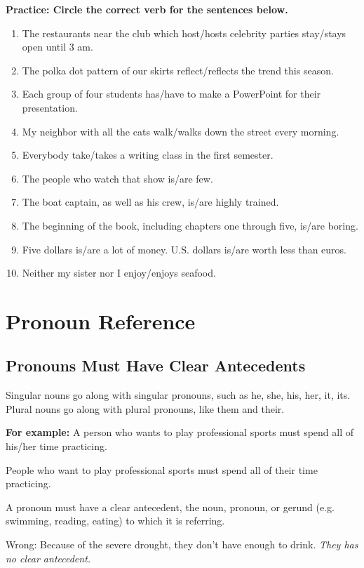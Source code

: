 \documentclass[12pt]{book}
\begin{document}
\bigskip
\textbf{Practice: Circle the correct verb for the sentences below.}
\begin{enumerate} 
\item{The restaurants near the club which host/hosts celebrity parties stay/stays open until 3 am.}
\item{The polka dot pattern of our skirts reflect/reflects the trend this season.}
\item{Each group of four students has/have to make a PowerPoint for their presentation.}
\item{My neighbor with all the cats walk/walks down the street every morning.}
\item{Everybody take/takes a writing class in the first semester.}
\item{The people who watch that show is/are few.}
\item{The boat captain, as well as his crew, is/are highly trained.}
\item{The beginning of the book, including chapters one through five, is/are boring.}
\item{Five dollars is/are a lot of money.  U.S. dollars is/are worth less than euros.}
\item{Neither my sister nor I enjoy/enjoys seafood.}
\end{enumerate}

\bigskip

\bigskip
\section{Pronoun Reference}
\subsection{Pronouns Must Have Clear Antecedents}
Singular nouns go along with singular pronouns, such as he, she, his, her, it, its.
Plural nouns go along with plural pronouns, like them and their.

\bigskip
\textbf{For example:}
A person who wants to play professional sports must spend all of his/her time practicing.

\bigskip
People who want to play professional sports must spend all of their time practicing.

\bigskip
A pronoun must have a clear antecedent, the noun, pronoun, or gerund (e.g. swimming, reading, eating) to which it is referring.

\bigskip
Wrong: Because of the severe drought, they don't have enough to drink.
\textit{They has no clear antecedent.}
\end{document}
